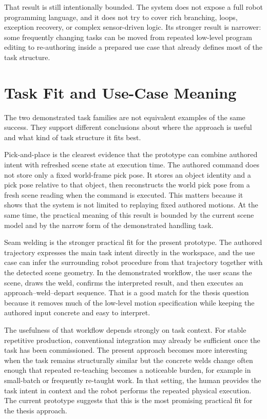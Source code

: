 That result is still intentionally bounded. The system does not expose a full robot programming language, and it does not try to cover rich branching, loops, exception recovery, or complex sensor-driven logic. Its stronger result is narrower: some frequently changing tasks can be moved from repeated low-level program editing to re-authoring inside a prepared use case that already defines most of the task structure.

\section{Task Fit and Use-Case Meaning}

The two demonstrated task families are not equivalent examples of the same success. They support different conclusions about where the approach is useful and what kind of task structure it fits best.

Pick-and-place is the clearest evidence that the prototype can combine authored intent with refreshed scene state at execution time. The authored command does not store only a fixed world-frame pick pose. It stores an object identity and a pick pose relative to that object, then reconstructs the world pick pose from a fresh scene reading when the command is executed. This matters because it shows that the system is not limited to replaying fixed authored motions. At the same time, the practical meaning of this result is bounded by the current scene model and by the narrow form of the demonstrated handling task.

Seam welding is the stronger practical fit for the present prototype. The authored trajectory expresses the main task intent directly in the workspace, and the use case can infer the surrounding robot procedure from that trajectory together with the detected scene geometry. In the demonstrated workflow, the user scans the scene, draws the weld, confirms the interpreted result, and then executes an approach--weld--depart sequence. That is a good match for the thesis question because it removes much of the low-level motion specification while keeping the authored input concrete and easy to interpret.

The usefulness of that workflow depends strongly on task context. For stable repetitive production, conventional integration may already be sufficient once the task has been commissioned. The present approach becomes more interesting when the task remains structurally similar but the concrete welds change often enough that repeated re-teaching becomes a noticeable burden, for example in small-batch or frequently re-taught work. In that setting, the human provides the task intent in context and the robot performs the repeated physical execution. The current prototype suggests that this is the most promising practical fit for the thesis approach.


